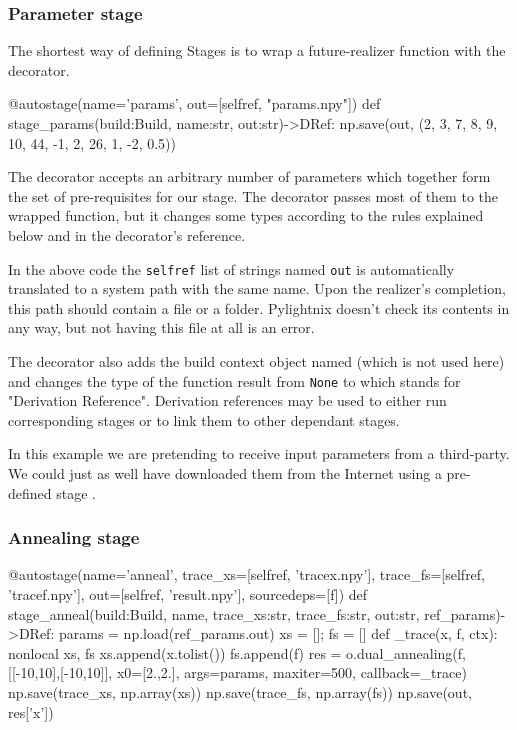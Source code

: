 \subsubsection{Parameter stage}

The shortest way of defining Stages is to wrap a future-realizer function with
the  decorator.

\begin{pythontexcode}
@autostage(name='params',
           out=[selfref, "params.npy"])
def stage_params(build:Build, name:str, out:str)->DRef:
  np.save(out, (2, 3, 7, 8, 9, 10, 44, -1, 2, 26, 1, -2, 0.5))
\end{pythontexcode}

The decorator accepts an arbitrary number of parameters which together form the
set of pre-requisites for our stage. The decorator passes most of them to the
wrapped function, but it changes some types according to the rules explained
below and in the decorator's reference.

In the above code the \texttt{selfref} list of strings named \texttt{out}
is automatically translated to a system path with the same name. Upon the
realizer's completion, this path should contain a file or a folder. Pylightnix
doesn't check its contents in any way, but not having this file at all is an
error.

The decorator also adds the build context object named
 (which is not used here) and changes the
type of the function result from \texttt{None} to
 which stands for "Derivation Reference".
Derivation references may be used to either run corresponding stages or to link
them to other dependant stages.

In this example we are pretending to receive input parameters from a
third-party. We could just as well have downloaded them from the Internet using
a pre-defined stage .

\subsubsection{Annealing stage}

\begin{pythontexcode}

@autostage(name='anneal',
           trace_xs=[selfref, 'tracex.npy'],
           trace_fs=[selfref, 'tracef.npy'],
           out=[selfref, 'result.npy'],
           sourcedeps=[f])
def stage_anneal(build:Build, name,
                 trace_xs:str, trace_fs:str, out:str,
                 ref_params)->DRef:
  params = np.load(ref_params.out)
  xs = []; fs = []
  def _trace(x, f, ctx):
    nonlocal xs, fs
    xs.append(x.tolist())
    fs.append(f)
  res = o.dual_annealing(f, [[-10,10],[-10,10]],
                         x0=[2.,2.], args=params,
                         maxiter=500, callback=_trace)
  np.save(trace_xs, np.array(xs))
  np.save(trace_fs, np.array(fs))
  np.save(out, res['x'])
\end{pythontexcode}

